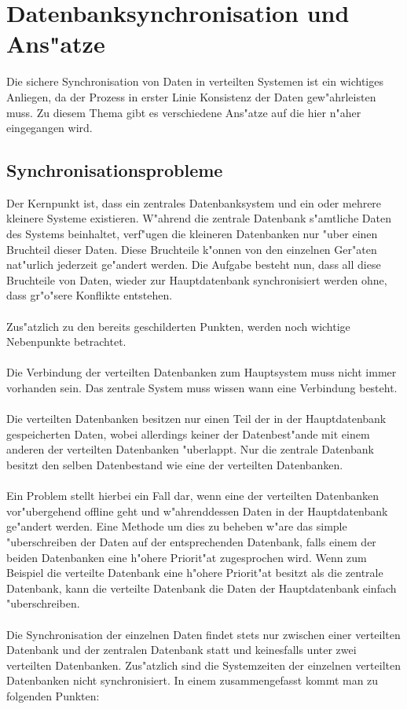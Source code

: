 \documentclass[a4paper,12pt]{scrreprt}
\begin{document}
\section{Datenbanksynchronisation und Ans"atze}
Die sichere Synchronisation von Daten in verteilten Systemen ist ein wichtiges Anliegen, da der Prozess in erster Linie Konsistenz der Daten gew"ahrleisten muss. Zu diesem Thema gibt es verschiedene Ans"atze auf die hier n"aher eingegangen wird.
\subsection{Synchronisationsprobleme}
Der Kernpunkt ist, dass ein zentrales Datenbanksystem und ein oder mehrere kleinere Systeme existieren. W"ahrend die zentrale Datenbank s"amtliche Daten des Systems beinhaltet, verf"ugen die kleineren Datenbanken nur "uber einen Bruchteil dieser Daten. Diese Bruchteile k"onnen von den einzelnen Ger"aten nat"urlich jederzeit ge"andert werden. Die Aufgabe besteht nun, dass all diese Bruchteile von Daten, wieder zur Hauptdatenbank synchronisiert werden ohne, dass gr"o"sere Konflikte entstehen.\\\\Zus"atzlich zu den bereits geschilderten Punkten, werden noch wichtige Nebenpunkte betrachtet.\\\\Die Verbindung der verteilten Datenbanken zum Hauptsystem muss nicht immer vorhanden sein. Das zentrale System muss wissen wann eine Verbindung besteht.\\\\Die verteilten Datenbanken besitzen nur einen Teil der in der Hauptdatenbank gespeicherten Daten, wobei allerdings keiner der Datenbest"ande mit einem anderen der verteilten Datenbanken "uberlappt. Nur die zentrale Datenbank besitzt den selben Datenbestand wie eine der verteilten Datenbanken.\\\\Ein Problem stellt hierbei ein Fall dar, wenn eine der verteilten Datenbanken vor"ubergehend offline geht und w"ahrenddessen Daten in der Hauptdatenbank ge"andert werden. Eine Methode um dies zu beheben w"are das simple "uberschreiben der Daten auf der entsprechenden Datenbank, falls einem der beiden Datenbanken eine h"ohere Priorit"at zugesprochen wird. Wenn zum Beispiel die verteilte Datenbank eine h"ohere Priorit"at besitzt als die zentrale Datenbank, kann die verteilte Datenbank die Daten der Hauptdatenbank einfach "uberschreiben. \\\\ Die Synchronisation der einzelnen Daten findet stets nur zwischen einer verteilten Datenbank und der zentralen Datenbank statt und keinesfalls unter zwei verteilten Datenbanken. Zus"atzlich sind die Systemzeiten der einzelnen verteilten Datenbanken nicht synchronisiert. In einem zusammengefasst kommt man zu folgenden Punkten:
\end{document}
